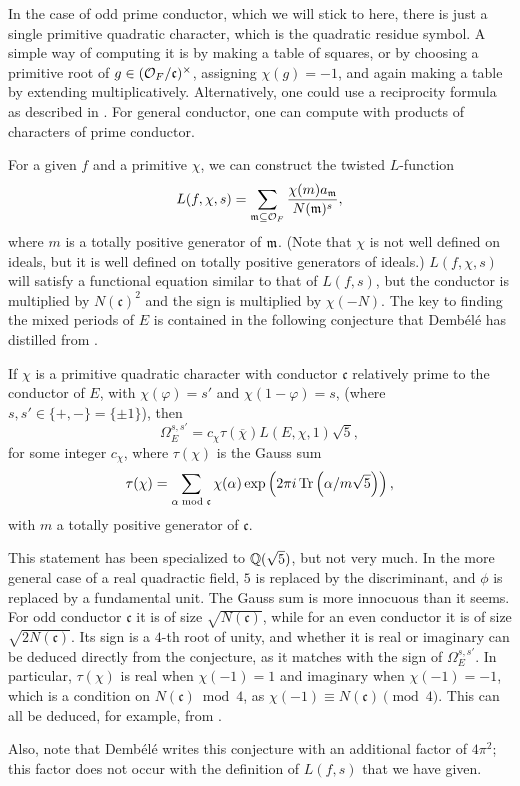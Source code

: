 \documentclass{amsart}
\newcommand{\fc}{\mathfrak{c}}
\newcommand{\OF}{\cO_F}
\newcommand{\dembele}{Demb\'el{\'e}\xspace}
\begin{document}
In the case of odd prime
conductor, which we will stick to here, there is just a single primitive quadratic character,
which is the quadratic residue symbol. A simple way of computing it is by making a
table of squares, or by choosing a primitive root of $g \in (\OF/\fc)^\times$, assigning
$\chi(g) = -1$, and again making a table by extending multiplicatively. Alternatively,
one could use a reciprocity formula as described in \cite{boylan-skoruppa:hecke-gauss-sums}.
For general conductor, one can compute with products of characters of prime conductor.

For a given $f$ and a primitive $\chi$, we can construct the twisted $L$-function
\[
    L(f, \chi, s) = \sum_{\m \subseteq \OF} \frac{\chi(m)a{_{\m}}}{N(\m)^s},
\]
where $m$ is a totally positive generator of $\mathfrak{m}$. (Note that $\chi$ is not well defined
on ideals, but it is well defined on totally positive generators of ideals.) $L(f, \chi, s)$
will satisfy a functional equation similar to that of $L(f, s)$, but the conductor is
multiplied by $N(\fc)^2$ and the sign is multiplied by $\chi(-N)$. The key to finding the
mixed periods of $E$ is contained in the following conjecture that \dembele has distilled
from \cite{bertolini-darmon-green}.
\begin{conjecture}
If $\chi$ is a primitive quadratic character with conductor $\fc$ relatively prime to the
conductor of $E$, with $\chi(\varphi) = s'$ and
$\chi(1 - \varphi) = s$, (where $s, s' \in \{+, -\} = \{\pm1\}$), then
\[
    \Omega^{s,s'}_E = c_\chi \tau(\overline\chi) L(E, \chi, 1)\sqrt5,
\]
for some integer $c_\chi$, where $\tau(\chi)$ is the Gauss sum
\[
    \tau(\chi) = \sum_{\alpha \bmod \fc} \chi(\alpha) \exp\left(2 \pi i \Tr\left(\alpha/m\sqrt{5}\right) \right),
\]
with $m$ a totally positive generator of $\fc$.
\end{conjecture}
\begin{remark}
This statement has been specialized to $\mathbb{Q}(\sqrt 5)$, but not very much. In the more general
case of a real quadractic field, $5$ is replaced by the discriminant, and $\phi$ is replaced
by a fundamental unit.
The Gauss sum is more innocuous than it seems. For odd conductor $\fc$ it is of size
$\sqrt{N(\fc)}$, while for an even conductor it is of size $\sqrt{2 N(\fc) }$.
Its sign is a $4$-th root of unity, and whether it is real or imaginary can be deduced
directly from the conjecture, as it matches with the sign of $\Omega^{s,s'}_E$. In particular,
$\tau(\chi)$ is real when $\chi(-1) = 1$ and imaginary when $\chi(-1) = -1$, which is a
condition on $N(\fc) \bmod 4$, as $\chi(-1) \equiv N(\fc) \pmod 4$. This can all be deduced,
for example, from \cite{boylan-skoruppa:hecke-gauss-sums}.

Also, note that \dembele writes this conjecture with an additional factor of $4\pi^2$;
this factor does not occur with the definition of $L(f, s)$ that we have given.

\end{remark}
\end{document}
